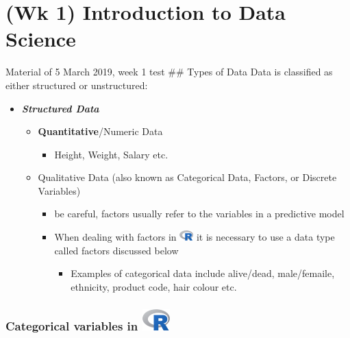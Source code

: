 \documentclass[]{book}
\providecommand{\tightlist}{%
  \setlength{\itemsep}{0pt}\setlength{\parskip}{0pt}}
\begin{document}
\hypertarget{wk-1-introduction-to-data-science}{%
\chapter{(Wk 1) Introduction to Data Science}\label{wk-1-introduction-to-data-science}}

Material of 5 March 2019, week 1
test
\#\# Types of Data
Data is classified as either structured or unstructured:

\begin{itemize}
\tightlist
\item
  \textbf{\emph{Structured Data}}

  \begin{itemize}
  \tightlist
  \item
    \textbf{Quantitative}/Numeric Data

    \begin{itemize}
    \tightlist
    \item
      Height, Weight, Salary etc.
    \end{itemize}
  \item
    Qualitative Data (also known as Categorical Data, Factors, or Discrete Variables)

    \begin{itemize}
    \tightlist
    \item
      be careful, factors usually refer to the variables in a predictive model
    \item
      When dealing with factors in \includegraphics{images/Ricon20px.png}
      it is necessary to use a data type called factors discussed below

      \begin{itemize}
      \tightlist
      \item
        Examples of categorical data include alive/dead, male/femaile, ethnicity, product code, hair colour etc.
      \end{itemize}
    \end{itemize}
  \end{itemize}
\end{itemize}

\hypertarget{categorical-variables-in}{%
\subsection[Categorical variables in ]{\texorpdfstring{Categorical variables in \protect\includegraphics{images/Ricon40px.png}}{Categorical variables in }}\label{categorical-variables-in}}
\end{document}
